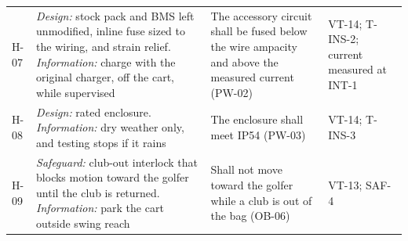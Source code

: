 \begin{table}[!htbp]
\begin{tabularx}{\linewidth}{@{}L{0.35in} Y Y L{0.85in}@{}}
\addlinespace[2pt]
H-07 & \textit{Design:} stock pack and \acs{BMS} left unmodified, inline fuse sized to the wiring, and strain relief. \textit{Information:} charge with the original charger, off the cart, while supervised & The accessory circuit shall be fused below the wire ampacity and above the measured current (PW-02) & VT-14; T-INS-2; current measured at INT-1 \\
\addlinespace[2pt]
H-08 & \textit{Design:} rated enclosure. \textit{Information:} dry weather only, and testing stops if it rains & The enclosure shall meet IP54 (PW-03) & VT-14; T-INS-3 \\
\addlinespace[2pt]
H-09 & \textit{Safeguard:} club-out interlock that blocks motion toward the golfer until the club is returned. \textit{Information:} park the cart outside swing reach & Shall not move toward the golfer while a club is out of the bag (OB-06) & VT-13; SAF-4 \\
\bottomrule
\end{tabularx}
\end{table}

